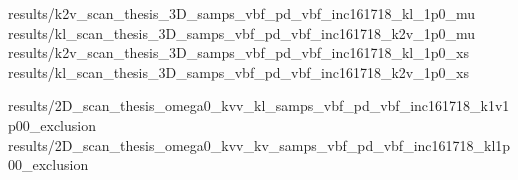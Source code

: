 {results/k2v_scan_thesis_3D_samps_vbf_pd_vbf_inc161718_kl_1p0_mu}
{results/kl_scan_thesis_3D_samps_vbf_pd_vbf_inc161718_k2v_1p0_mu}
{results/k2v_scan_thesis_3D_samps_vbf_pd_vbf_inc161718_kl_1p0_xs}
{results/kl_scan_thesis_3D_samps_vbf_pd_vbf_inc161718_k2v_1p0_xs}


{results/2D_scan_thesis_omega0_kvv_kl_samps_vbf_pd_vbf_inc161718_k1v1p00_exclusion}
{results/2D_scan_thesis_omega0_kvv_kv_samps_vbf_pd_vbf_inc161718_kl1p00_exclusion}
